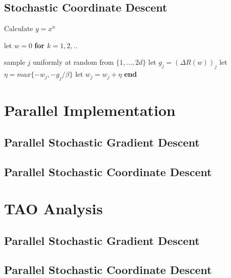 \documentclass{sigplanconf}
\newlength\myindent
\newcommand\bindent{%
  \begingroup
  \setlength{\itemindent}{\myindent}
  \addtolength{\algorithmicindent}{\myindent}
}
\newcommand\eindent{\endgroup}
\begin{document}
\subsection{Stochastic Coordinate Descent}

\begin{algorithm}
\caption{Calculate $y = x^n$}
\begin{algorithmic} 
\STATE let $w = 0$
\STATE \bf{for} \begin{math} k = 1,2,.. \end{math}
    \bindent
	\STATE \textnormal{sample \begin{math}j\end{math} uniformly at random from \begin{math}\{1,...,2d\}\end{math}}
	\STATE \textnormal{let \begin{math}g_j = (\Delta{R(w)})_j\end{math}}
	\STATE \textnormal{let \begin{math}\eta = max\{ -w_j, -g_j/\beta \}\end{math}}
	\STATE \textnormal{let \begin{math}w_j = w_j + \eta\end{math}}
    \eindent
\STATE \bf{end}
\end{algorithmic}
\end{algorithm}




\section{Parallel Implementation}
\subsection{Parallel Stochastic Gradient Descent}
\subsection{Parallel Stochastic Coordinate Descent}

\section{TAO Analysis}
\subsection{Parallel Stochastic Gradient Descent}
\subsection{Parallel Stochastic Coordinate Descent}
\end{document}
